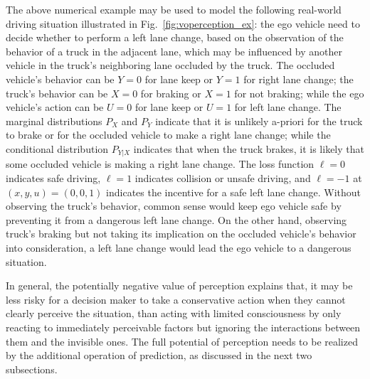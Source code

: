 \documentclass{article}
\begin{document}
The above numerical example may be used to model the following real-world driving situation illustrated in Fig.~\ref{fig:voperception_ex}: the ego vehicle need to decide whether to perform a left lane change, based on the observation of the behavior of a truck in the adjacent lane, which may be influenced by another vehicle in the truck's neighboring lane occluded by the truck.  The occluded vehicle's behavior can be $Y=0$ for lane keep or $Y=1$ for right lane change; the truck's behavior can be $X=0$ for braking or $X=1$ for not braking; while the ego vehicle's action can be $U=0$ for lane keep or $U=1$ for left lane change. The marginal distributions $P_X$ and $P_Y$ indicate that it is unlikely a-priori for the truck to brake or for the occluded vehicle to make a right lane change; while the conditional distribution $P_{Y|X}$ indicates that when the truck brakes, it is likely that some occluded vehicle is making a right lane change. The loss function $\ell=0$ indicates safe driving, $\ell=1$ indicates collision or unsafe driving, and $\ell=-1$ at $(x,y,u)=(0,0,1)$ indicates the incentive for a safe left lane change.
Without observing the truck's behavior, common sense would keep ego vehicle safe by preventing it from a dangerous left lane change. On the other hand, observing truck's braking but not taking its implication on the occluded vehicle's behavior into consideration, a left lane change would lead the ego vehicle to a dangerous situation. 

In general, the potentially negative value of perception explains that, it may be less risky for a decision maker to take a conservative action when they cannot clearly perceive the  situation, than acting with limited consciousness by only reacting to immediately perceivable factors but ignoring the interactions between them and the invisible ones.
The full potential of perception needs to be realized by the additional operation of prediction, as discussed in the next two subsections.
\end{document}

